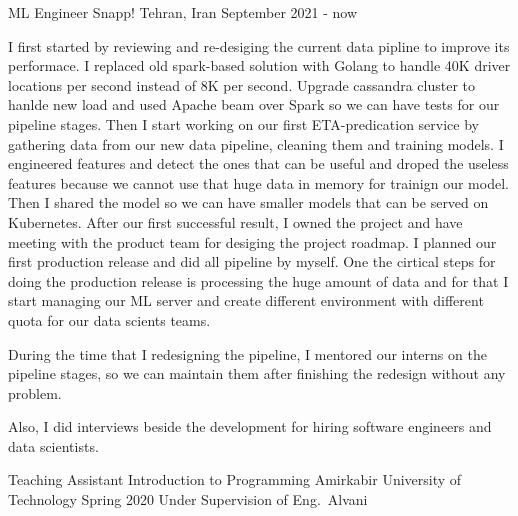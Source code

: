 \begin{cventries}
  \cventry
    {ML Engineer} %
    {Snapp!} %
    {Tehran, Iran} %
    {September 2021 - now} %
    {
      I first started by reviewing and re-desiging the current data pipline to improve its performace.
      I replaced old spark-based solution with Golang to handle 40K driver locations per second instead of
      8K per second. Upgrade cassandra cluster to hanlde new load and used Apache beam over Spark so we can
      have tests for our pipeline stages. Then I start working on our first ETA-predication service by gathering data
      from our new data pipeline, cleaning them and training models. I engineered features and detect the ones that can
      be useful and droped the useless features because we cannot use that huge data in memory for trainign our model.
      Then I shared the model so we can have smaller models that can be served on Kubernetes.
      After our first successful result, I owned the project and have meeting with the product team for desiging
      the project roadmap. I planned our first production release and did all pipeline by myself.
      One the cirtical steps for doing the production release is processing the huge amount of data and for that I
      start managing our ML server and create different environment with different quota for our data scients teams.

      During the time that I redesigning the pipeline, I mentored our interns on the pipeline stages, so we can maintain
      them after finishing the redesign without any problem.

      Also, I did interviews beside the development for hiring software engineers and data scientists.
    }

\end{cventries}


\begin{cventries}

  \cventry
    {Teaching Assistant} %
    {Introduction to Programming} %
    {Amirkabir University of Technology} %
    {Spring 2020} %
    {Under Supervision of Eng.~Alvani}


\end{cventries}
